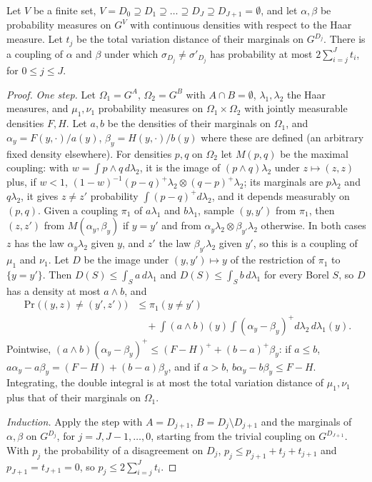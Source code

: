 \begin{lemma}\label{rW9:nested}
Let $V$ be a finite set, $V=D_0\supseteq D_1\supseteq\dots\supseteq D_J
\supseteq D_{J+1}=\emptyset$, and let $\alpha,\beta$ be probability measures
on $G^V$ with continuous densities with respect to the Haar measure. Let
$t_j$ be the total variation distance of their marginals on $G^{D_j}$. There
is a coupling of $\alpha$ and $\beta$ under which $\sigma_{D_j}\ne
\sigma'_{D_j}$ has probability at most $2\sum_{i=j}^Jt_i$, for $0\le j\le J$.
\end{lemma}

\begin{proof}
\emph{One step.} Let $\Omega_1=G^{A}$, $\Omega_2=G^{B}$ with $A\cap B=
\emptyset$, $\lambda_1,\lambda_2$ the Haar measures, and $\mu_1,\nu_1$
probability measures on $\Omega_1\times\Omega_2$ with jointly measurable
densities $F,H$. Let $a,b$ be the densities of their marginals on $\Omega_1$,
and $\alpha_y=F(y,\cdot)/a(y)$, $\beta_y=H(y,\cdot)/b(y)$ where these are
defined (an arbitrary fixed density elsewhere). For densities $p,q$ on
$\Omega_2$ let $M(p,q)$ be the maximal coupling: with $w=\int p\wedge q\,
d\lambda_2$, it is the image of $(p\wedge q)\lambda_2$ under $z\mapsto(z,z)$
plus, if $w<1$, $(1-w)^{-1}(p-q)^+\lambda_2\otimes(q-p)^+\lambda_2$; its
marginals are $p\lambda_2$ and $q\lambda_2$, it gives $z\ne z'$ probability
$\int(p-q)^+d\lambda_2$, and it depends measurably on $(p,q)$. Given a
coupling $\pi_1$ of $a\lambda_1$ and $b\lambda_1$, sample $(y,y')$ from
$\pi_1$, then $(z,z')$ from $M(\alpha_y,\beta_y)$ if $y=y'$ and from
$\alpha_y\lambda_2\otimes\beta_{y'}\lambda_2$ otherwise. In both cases $z$
has the law $\alpha_y\lambda_2$ given $y$, and $z'$ the law
$\beta_{y'}\lambda_2$ given $y'$, so this is a coupling of $\mu_1$ and $\nu_1$.
Let $D$ be the image under $(y,y')\mapsto y$ of the restriction of $\pi_1$ to
$\{y=y'\}$. Then $D(S)\le\int_Sa\,d\lambda_1$ and $D(S)\le\int_Sb\,d
\lambda_1$ for every Borel $S$, so $D$ has a density at most $a\wedge b$, and
\[
\begin{split}
\Pr\bigl((y,z)\ne(y',z')\bigr)&\le\pi_1(y\ne y')\\
&\quad+\int(a\wedge b)(y)\int(\alpha_y-\beta_y)^+d\lambda_2\,
d\lambda_1(y).
\end{split}
\]
Pointwise, $(a\wedge b)(\alpha_y-\beta_y)^+\le(F-H)^++(b-a)^+\beta_y$: if
$a\le b$, $a\alpha_y-a\beta_y=(F-H)+(b-a)\beta_y$, and if $a>b$, $b\alpha_y-b
\beta_y\le F-H$. Integrating, the double integral is at most the total
variation distance of $\mu_1,\nu_1$ plus that of their marginals on
$\Omega_1$.

\emph{Induction.} Apply the step with $A=D_{j+1}$, $B=D_j\setminus D_{j+1}$
and the marginals of $\alpha,\beta$ on $G^{D_j}$, for $j=J,J-1,\dots,0$,
starting from the trivial coupling on $G^{D_{J+1}}$. With $p_j$ the
probability of a disagreement on $D_j$, $p_j\le p_{j+1}+t_j+t_{j+1}$ and
$p_{J+1}=t_{J+1}=0$, so $p_j\le2\sum_{i=j}^Jt_i$.
\end{proof}

